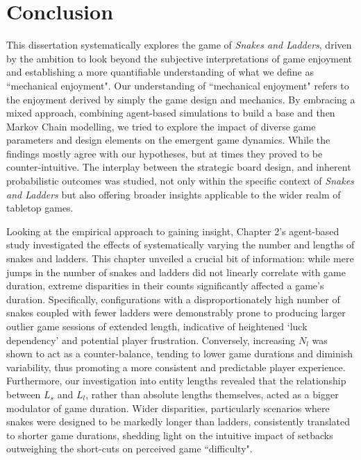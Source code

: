 \chapter{Conclusion}
This dissertation systematically explores the game of \textit{Snakes and Ladders}, driven by the ambition to look beyond the subjective interpretations of game enjoyment and establishing a more quantifiable understanding of what we define as ``mechanical enjoyment".  Our understanding of ``mechanical enjoyment" refers to the enjoyment derived by simply the game design and mechanics. By embracing a mixed approach, combining agent-based simulations to build a base and then Markov Chain modelling, we tried to explore the impact of diverse game parameters and design elements on the emergent game dynamics. While the findings mostly agree with our hypotheses, but at times they proved to be counter-intuitive. The interplay between the strategic board design, and inherent probabilistic outcomes was studied, not only within the specific context of \textit{Snakes and Ladders} but also offering broader insights applicable to the wider realm of tabletop games.

Looking at the empirical approach to gaining insight, Chapter 2’s agent-based study investigated the effects of systematically varying the number and lengths of snakes and ladders.  This chapter unveiled a crucial bit of information: while mere jumps in the number of snakes and ladders did not linearly correlate with game duration, extreme disparities in their counts significantly affected a game's duration.  Specifically, configurations with a disproportionately high number of snakes coupled with fewer ladders were demonstrably prone to producing larger outlier game sessions of extended length, indicative of heightened ‘luck dependency’ and potential player frustration. Conversely, increasing $N_l$ was shown to act as a counter-balance, tending to lower game durations and diminish variability, thus promoting a more consistent and predictable player experience.  Furthermore, our investigation into entity lengths revealed that the relationship between $L_s$ and $L_l$, rather than absolute lengths themselves, acted as a bigger modulator of game duration. Wider disparities, particularly scenarios where snakes were designed to be markedly longer than ladders, consistently translated to shorter game durations, shedding light on the intuitive impact of setbacks outweighing the short-cuts on perceived game ``difficulty".

